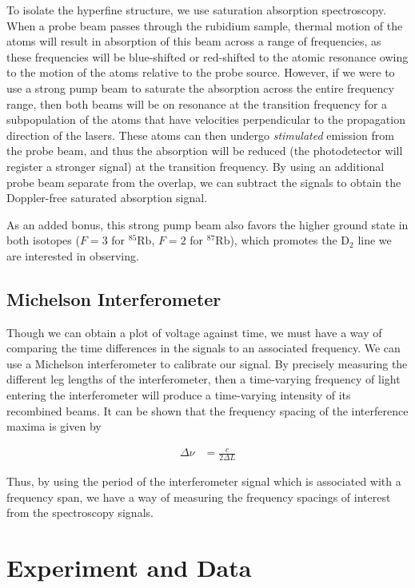 \documentclass[12pt]{article}
\begin{document}
To isolate the hyperfine structure, we use saturation absorption spectroscopy.  When a probe beam passes through the rubidium sample, thermal motion of the atoms will result in absorption of this beam across a range of frequencies, as these frequencies will be blue-shifted or red-shifted to the atomic resonance owing to the motion of the atoms relative to the probe source.  However, if we were to use a strong pump beam to saturate the absorption across the entire frequency range, then both beams will be on resonance at the transition frequency for a subpopulation of the atoms that have velocities perpendicular to the propagation direction of the lasers.  These atoms can then undergo \textit{stimulated} emission from the probe beam, and thus the absorption will be reduced (the photodetector will register a stronger signal) at the transition frequency.  By using an additional probe beam separate from the overlap, we can subtract the signals to obtain the Doppler-free saturated absorption signal.

As an added bonus, this strong pump beam also favors the higher ground state in both isotopes ($F=3$ for ${}^{85}\text{Rb}$, $F = 2$ for ${}^{87}\text{Rb}$), which promotes the D$_2$ line we are interested in observing.

\subsection*{Michelson Interferometer}

Though we can obtain a plot of voltage against time, we must have a way of comparing the time differences in the signals to an associated frequency.  We can use a Michelson interferometer to calibrate our signal.  By precisely measuring the different leg lengths of the interferometer, then a time-varying frequency of light entering the interferometer will produce a time-varying intensity of its recombined beams.  It can be shown that the frequency spacing of the interference maxima is given by

\begin{align}
	\Delta \nu &= \frac{c}{2 \Delta L}\label{eq:interferometer}
\end{align}

Thus, by using the period of the interferometer signal which is associated with a frequency span, we have a way of measuring the frequency spacings of interest from the spectroscopy signals.

\section*{Experiment and Data}
\end{document}
